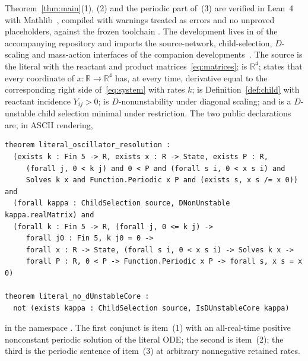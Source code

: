 \documentclass[11pt,a4paper]{article}
\theoremstyle{plain}
\theoremstyle{definition}
\theoremstyle{remark}
\newcommand{\R}{\mathbb{R}}
\begin{document}
Theorem~\ref{thm:main}(1), (2) and the periodic part of~(3) are verified in Lean~4~\cite{Lean4} with Mathlib~\cite{Mathlib}, compiled with warnings treated as errors and no unproved placeholders, against the frozen toolchain . The development lives in  of the accompanying repository and imports the source-network, child-selection, $D$-scaling and mass-action interfaces of the companion developments~\cite{ParameterRich2026,KineticOrder2026}. The source is the literal   with the reactant and product matrices~\eqref{eq:matrices};  is $\R^4$;  states that every coordinate of $x\colon\R\to\R^4$ has, at every time, derivative equal to the corresponding right side of~\eqref{eq:system} with rates $k$;  is Definition~\ref{def:child} with reactant incidence $Y_{ij}>0$;  is $D$-nonunstability under diagonal scaling; and  is a $D$-unstable child selection minimal under restriction. The two public declarations are, in ASCII rendering,
\begin{verbatim}
theorem literal_oscillator_resolution :
  (exists k : Fin 5 -> R, exists x : R -> State, exists P : R,
     (forall j, 0 < k j) and 0 < P and (forall s i, 0 < x s i) and
     Solves k x and Function.Periodic x P and (exists s, x s /= x 0)) and
  (forall kappa : ChildSelection source, DNonUnstable kappa.realMatrix) and
  (forall k : Fin 5 -> R, (forall j, 0 <= k j) ->
     forall j0 : Fin 5, k j0 = 0 ->
     forall x : R -> State, (forall s i, 0 < x s i) -> Solves k x ->
     forall P : R, 0 < P -> Function.Periodic x P -> forall s, x s = x 0)

theorem literal_no_dUnstableCore :
  not (exists kappa : ChildSelection source, IsDUnstableCore kappa)
\end{verbatim}
in the namespace . The first conjunct is item~(1) with an all-real-time positive nonconstant periodic solution of the literal ODE; the second is item~(2); the third is the periodic sentence of item~(3) at arbitrary nonnegative retained rates.
\end{document}
